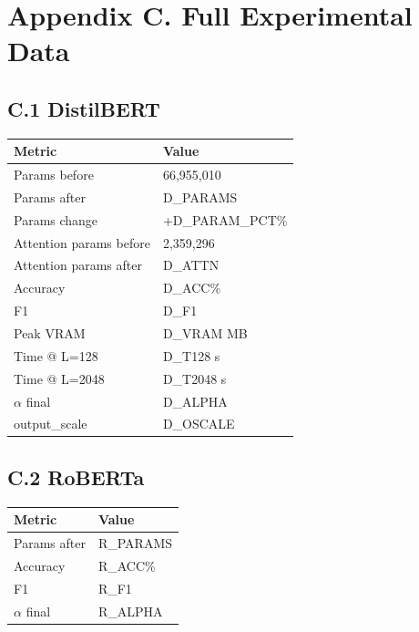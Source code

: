 \section{Appendix C. Full Experimental Data}

\subsection{C.1 DistilBERT}

\begin{table}[H]
\centering
\small
\begin{tabular}{ll}
\toprule
\textbf{Metric} & \textbf{Value} \\
\midrule
Params before & 66,955,010 \\
Params after & {{D\_PARAMS}} \\
Params change & +{{D\_PARAM\_PCT}}\% \\
Attention params before & 2,359,296 \\
Attention params after & {{D\_ATTN}} \\
Accuracy & {{D\_ACC}}\% \\
F1 & {{D\_F1}} \\
Peak VRAM & {{D\_VRAM}} MB \\
Time @ L=128 & {{D\_T128}} s \\
Time @ L=2048 & {{D\_T2048}} s \\
$\alpha$ final & {{D\_ALPHA}} \\
output\_scale & {{D\_OSCALE}} \\
\bottomrule
\end{tabular}
\end{table}

\subsection{C.2 RoBERTa}

\begin{table}[H]
\centering
\small
\begin{tabular}{ll}
\toprule
\textbf{Metric} & \textbf{Value} \\
\midrule
Params after & {{R\_PARAMS}} \\
Accuracy & {{R\_ACC}}\% \\
F1 & {{R\_F1}} \\
$\alpha$ final & {{R\_ALPHA}} \\
\bottomrule
\end{tabular}
\end{table}

